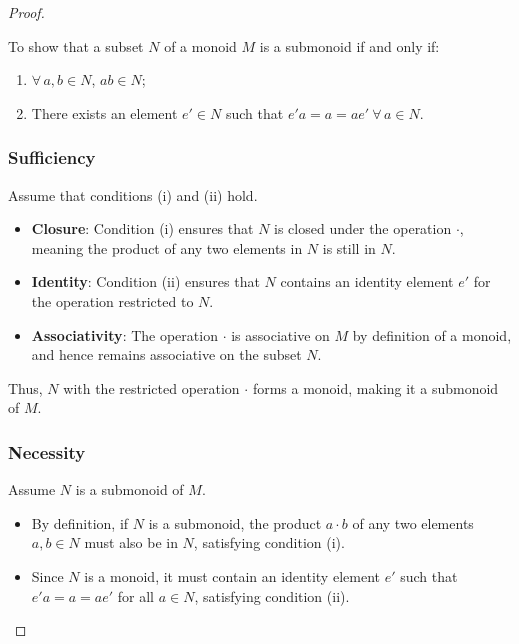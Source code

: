 \documentclass[12pt]{amsart}
\theoremstyle{definition}
\numberwithin{equation}{section}
\begin{document}
\begin{exercise}{2}
    \begin{proof} \( \)
    
    To show that a subset \(N\) of a monoid \(M\) is a submonoid if and only if:
    
    \begin{enumerate}[label=(\roman*)]
        \item \(\forall \, a, b \in N\), \(ab \in N\);
        \item There exists an element \(e' \in N\) such that \(e'a = a = ae' \ \forall \, a \in N\).
    \end{enumerate}
    
    \subsubsection*{Sufficiency}
    
    Assume that conditions (i) and (ii) hold.
    
    \begin{itemize}[label=--]
        \item \textbf{Closure}: Condition (i) ensures that \(N\) is closed under the operation \(\cdot\), meaning the product of any two elements in \(N\) is still in \(N\).
        \item \textbf{Identity}: Condition (ii) ensures that \(N\) contains an identity element \(e'\) for the operation restricted to \(N\).
        \item \textbf{Associativity}: The operation \(\cdot\) is associative on \(M\) by definition of a monoid, and hence remains associative on the subset \(N\).
    \end{itemize}
    
    Thus, \(N\) with the restricted operation \(\cdot\) forms a monoid, making it a submonoid of \(M\).
    
    \subsubsection*{Necessity}
    
    Assume \(N\) is a submonoid of \(M\).
    
    \begin{itemize}[label=--]
        \item By definition, if \(N\) is a submonoid, the product \(a \cdot b\) of any two elements \(a, b \in N\) must also be in \(N\), satisfying condition (i).
        \item Since \(N\) is a monoid, it must contain an identity element \(e'\) such that \(e'a = a = ae'\) for all \(a \in N\), satisfying condition (ii).
    \end{itemize}
    

\end{proof}
\end{exercise}
\end{document}
